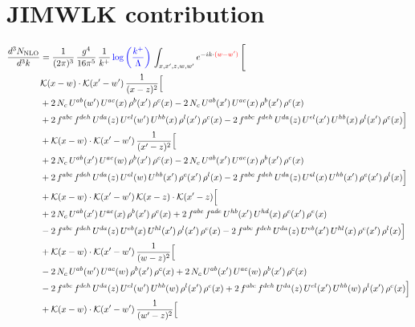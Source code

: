 \documentclass[9pt]{article}
\numberwithin{equation}{section}
\newcommand{\ph}[1]{{\color{red}#1}}
\begin{document}
\section{JIMWLK contribution}
\begin{align}
\frac{d^{3}N_{\mathrm{NLO}}}{d^{3}k} & = \frac{1}{(2\pi)^{3}}\,\frac{g^{4}}{16\pi^{5}}\,\frac{1}{k^{+}}\,{\color{blue}\log{\left(\frac{k^{+}}{\Lambda}\right)}}\,\int_{x,x',z,w,w'}e^{-ik\cdot\ph{(w-w')}}\,\Bigg[
\notag \\ & \mathcal{K}(x-w)\cdot\mathcal{K}(x'-w')\,\frac{1}{(x-z)^{2}}\Big[\notag\\
&+2\,N_{c}\,U^{ab}(w')\,U^{ac}(x)\,\rho^{b}(x')\,\rho^{c}(x) -2\,N_{c}\,U^{ab}(x')\,U^{ac}(x)\,\rho^{b}(x')\,\rho^{c}(x)\notag\\
& +2\,f^{abc}\,f^{deh}\,U^{da}(z)\,U^{el}(w')\,U^{hb}(x)\,\rho^{l}(x')\,\rho^{c}(x) -2\,f^{abc}\,f^{deh}\,U^{da}(z)\,U^{el}(x')\,U^{hb}(x)\,\rho^{l}(x')\,\rho^{c}(x)\Big]\notag\\
& +\mathcal{K}(x-w)\cdot\mathcal{K}(x'-w')\,\frac{1}{(x'-z)^{2}}\Big[\notag\\
& +2\,N_{c}\,U^{ab}(x')\,U^{ac}(w)\,\rho^{b}(x')\,\rho^{c}(x) -2\,N_{c}\,U^{ab}(x')\,U^{ac}(x)\,\rho^{b}(x')\,\rho^{c}(x)\notag\\
& +2\,f^{abc}\,f^{deh}\,U^{da}(z)\,U^{el}(w)\,U^{hb}(x')\,\rho^{c}(x')\,\rho^{l}(x) -2\,f^{abc}\,f^{deh}\,U^{da}(z)\,U^{el}(x)\,U^{hb}(x')\,\rho^{c}(x')\,\rho^{l}(x)\Big]\notag\\
& +\mathcal{K}(x-w)\cdot\mathcal{K}(x'-w')\,\mathcal{K}(x-z)\cdot\mathcal{K}(x'-z)\Big[\notag\\
& +2\,N_{c}\,U^{ab}(x')\,U^{ac}(x)\,\rho^{b}(x')\,\rho^{c}(x) +2\,f^{abc}\,f^{ade}\,U^{hb}(x')\,U^{hd}(x)\,\rho^{c}(x')\,\rho^{e}(x)\notag\\
& -2\,f^{abc}\,f^{deh}\,U^{da}(z)\,U^{eb}(x)\,U^{hl}(x')\,\rho^{l}(x')\,\rho^{c}(x) -2\,f^{abc}\,f^{deh}\,U^{da}(z)\,U^{eb}(x')\,U^{hl}(x)\,\rho^{c}(x')\,\rho^{l}(x)\Big]\notag\\
& +\mathcal{K}(x-w)\cdot\mathcal{K}(x'-w')\,\frac{1}{(w-z)^{2}}\Big[\notag\\
& -2\,N_{c}\,U^{ab}(w')\,U^{ac}(w)\,\rho^{b}(x')\,\rho^{c}(x) +2\,N_{c}\,U^{ab}(x')\,U^{ac}(w)\,\rho^{b}(x')\,\rho^{c}(x)\notag\\
& -2\,f^{abc}\,f^{deh}\,U^{da}(z)\,U^{el}(w')\,U^{hb}(w)\,\rho^{l}(x')\,\rho^{c}(x) +2\,f^{abc}\,f^{deh}\,U^{da}(z)\,U^{el}(x')\,U^{hb}(w)\,\rho^{l}(x')\,\rho^{c}(x)\Big]\notag\\
& +\mathcal{K}(x-w)\cdot\mathcal{K}(x'-w')\,\frac{1}{(w'-z)^{2}}\Big[\notag\\

\end{align}
\end{document}
